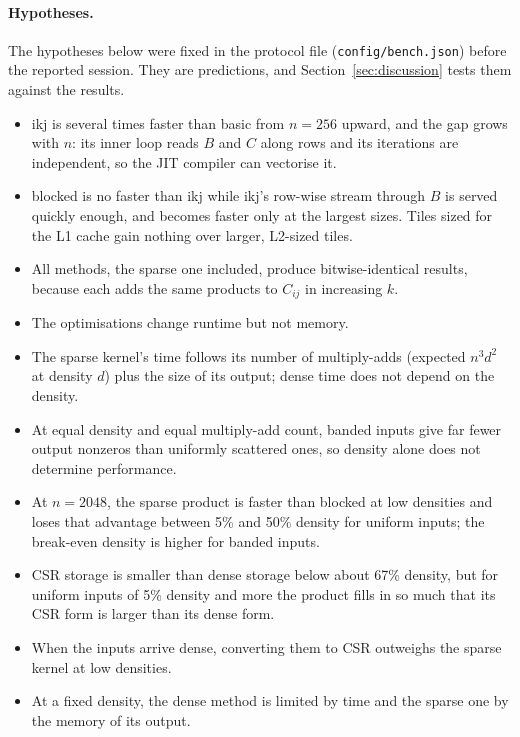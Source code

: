 \documentclass[11pt,a4paper]{article}
\begin{document}
\paragraph{Hypotheses.} The hypotheses below were fixed in the protocol file
(\texttt{config/bench.json}) before the reported session. They are predictions,
and Section~\ref{sec:discussion} tests them against the results.
\begin{itemize}
  \item[HA1] ikj is several times faster than basic from $n=256$ upward, and the
  gap grows with $n$: its inner loop reads $B$ and $C$ along rows and its
  iterations are independent, so the JIT compiler can vectorise it.
  \item[HA2] blocked is no faster than ikj while ikj's row-wise stream through
  $B$ is served quickly enough, and becomes faster only at the largest sizes.
  Tiles sized for the L1 cache gain nothing over larger, L2-sized tiles.
  \item[HA3] All methods, the sparse one included, produce bitwise-identical
  results, because each adds the same products to $C_{ij}$ in increasing $k$.
  \item[HA4] The optimisations change runtime but not memory.
  \item[HB1] The sparse kernel's time follows its number of multiply-adds
  (expected $n^3d^2$ at density $d$) plus the size of its output; dense time does
  not depend on the density.
  \item[HB2] At equal density and equal multiply-add count, banded inputs give
  far fewer output nonzeros than uniformly scattered ones, so density alone does
  not determine performance.
  \item[HB3] At $n=2048$, the sparse product is faster than blocked at low
  densities and loses that advantage between 5\% and 50\% density for uniform
  inputs; the break-even density is higher for banded inputs.
  \item[HB4] CSR storage is smaller than dense storage below about 67\% density,
  but for uniform inputs of 5\% density and more the product fills in so much
  that its CSR form is larger than its dense form.
  \item[HB5] When the inputs arrive dense, converting them to CSR outweighs the
  sparse kernel at low densities.
  \item[HB6] At a fixed density, the dense method is limited by time and the
  sparse one by the memory of its output.
\end{itemize}
\end{document}
